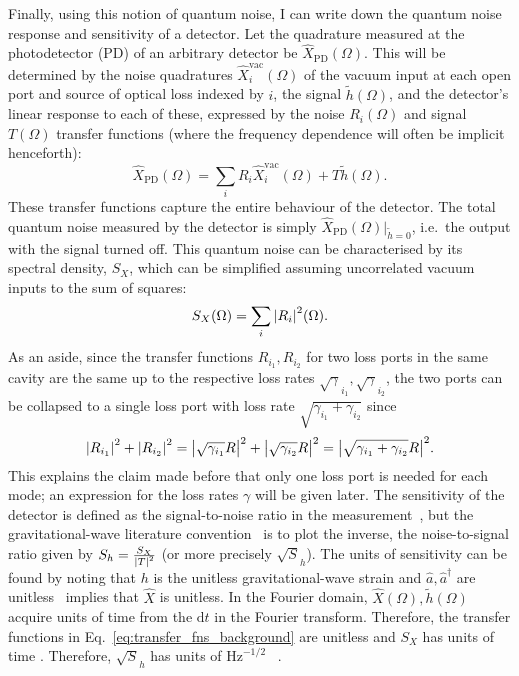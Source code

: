 Finally, using this notion of quantum noise, I can write down the quantum noise response and sensitivity of a detector. %
Let the quadrature measured at the photodetector (PD) of an arbitrary detector be $\hat{X}_\text{PD}(\Omega)$. This will be determined by the noise quadratures $\hat{X}_i^\text{vac}(\Omega)$ of the vacuum input at each open port and source of optical loss indexed by $i$, the signal $\tilde{h}(\Omega)$, and the detector's linear response to each of these, expressed by the noise $R_i(\Omega)$ and signal $T(\Omega)$ transfer functions (where the frequency dependence will often be implicit henceforth): \begin{equation}\label{eq:transfer_fns_background}\hat X_\text{PD}(\Omega)=\sum_i R_i \hat X_i^\text{vac}(\Omega) + T \tilde h(\Omega).\end{equation}
These transfer functions capture the entire behaviour of the detector. %
The total quantum noise measured by the detector is simply $\hat X_\text{PD}(\Omega)|_{\tilde h=0}$, i.e.\ the output with the signal turned off. This quantum noise can be characterised by its spectral density, $S_X$, which can be simplified assuming uncorrelated vacuum inputs to the sum of squares: \begin{equation}S_X(\Omega)=\sum_i \abs{R_i}^2(\Omega).\end{equation} 
As an aside, since the transfer functions $R_{i_1}, R_{i_2}$ for two loss ports in the same cavity are the same up to the respective loss rates $\sqrt\gamma_{i_1}, \sqrt\gamma_{i_2}$, the two ports can be collapsed to a single loss port with loss rate $\sqrt{\gamma_{i_1}+\gamma_{i_2}}$ since \begin{equation}\abs{R_{i_1}}^2+\abs{R_{i_2}}^2=\abs{\sqrt{\gamma_{i_1}}R}^2+\abs{\sqrt{\gamma_{i_2}}R}^2=\abs{\sqrt{\gamma_{i_1}+\gamma_{i_2}}R}^2.\end{equation} This explains the claim made before that only one loss port is needed for each mode; an expression for the loss rates $\gamma$ will be given later. 
The sensitivity of the detector is defined as the signal-to-noise ratio in the measurement~\cite{}, but the gravitational-wave literature convention~\cite{} is to plot the inverse, the noise-to-signal ratio given by $S_h = \frac{S_X}{\abs{T}^2}$ (or more precisely $\sqrt S_h$). The units of sensitivity can be found by noting that $h$ is the unitless gravitational-wave strain and $\hat a, \hat a^\dag$ are unitless~\cite{} implies that $\hat X$ is unitless. In the Fourier domain, $\hat X(\Omega), \tilde h(\Omega)$ acquire units of time from the $\text{d}t$ in the Fourier transform. Therefore, the transfer functions in Eq.~\ref{eq:transfer_fns_background} are unitless and $S_X$ has units of time . Therefore, $\sqrt S_h$ has units of $\text{Hz}^{-1/2}$~\cite{} . 
